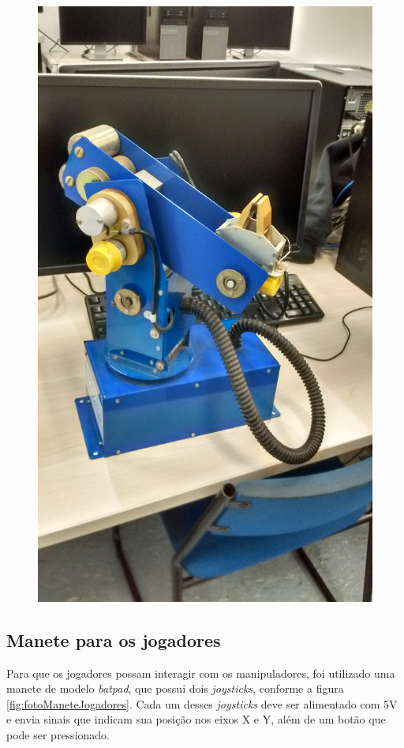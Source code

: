 \begin{figure}[H]
\begin{minipage}{.5\textwidth}
        \includegraphics[keepaspectratio=true, width=0.9\linewidth]
            {img/foto-manipulador-azul.jpg}
        \label{fig:fotoManipuladorAzul}
    \end{minipage}%
\end{figure}

\subsection[Manete para os jogadores]{Manete para os jogadores}
\label{sub:maneteJogadores}

Para que os jogadores possam interagir com os manipuladores, foi utilizado uma manete de modelo \textit{batpad}, que possui dois \textit{joysticks}, conforme a figura \ref{fig:fotoManeteJogadores}.
Cada um desses \textit{joysticks} deve ser alimentado com 5V e envia sinais que indicam sua posição nos eixos X e Y, além de um botão que pode ser pressionado.

